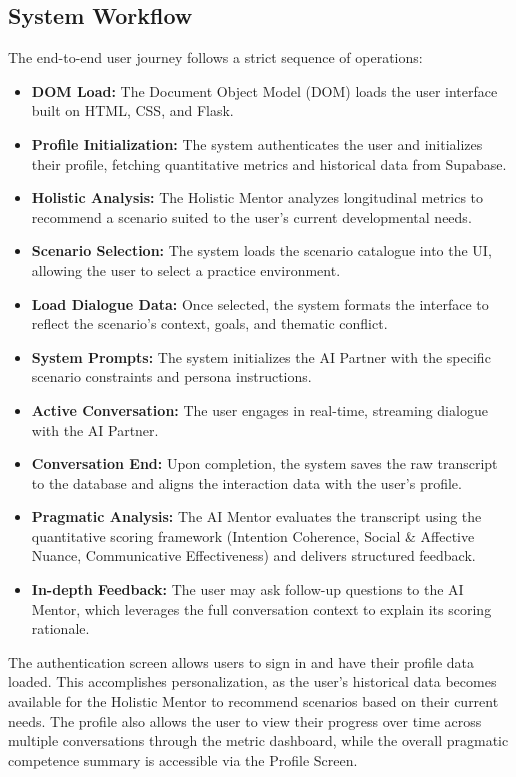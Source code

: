 \subsection{System Workflow}
The end-to-end user journey follows a strict sequence of operations:
\begin{itemize}
    \item \textbf{DOM Load:} The Document Object Model (DOM) loads the user interface built on HTML, CSS, and Flask.
    \item \textbf{Profile Initialization:} The system authenticates the user and initializes their profile, fetching quantitative metrics and historical data from Supabase.
    \item \textbf{Holistic Analysis:} The Holistic Mentor analyzes longitudinal metrics to recommend a scenario suited to the user's current developmental needs.
    \item \textbf{Scenario Selection:} The system loads the scenario catalogue into the UI, allowing the user to select a practice environment.
    \item \textbf{Load Dialogue Data:} Once selected, the system formats the interface to reflect the scenario's context, goals, and thematic conflict.
    \item \textbf{System Prompts:} The system initializes the AI Partner with the specific scenario constraints and persona instructions.
    \item \textbf{Active Conversation:} The user engages in real-time, streaming dialogue with the AI Partner.
    \item \textbf{Conversation End:} Upon completion, the system saves the raw transcript to the database and aligns the interaction data with the user's profile.
    \item \textbf{Pragmatic Analysis:} The AI Mentor evaluates the transcript using the quantitative scoring framework (Intention Coherence, Social \& Affective Nuance, Communicative Effectiveness) and delivers structured feedback.
    \item \textbf{In-depth Feedback:} The user may ask follow-up questions to the AI Mentor, which leverages the full conversation context to explain its scoring rationale.
\end{itemize}

The authentication screen allows users to sign in and have their profile data loaded. This accomplishes personalization, as the user's historical data becomes available for the Holistic Mentor to recommend scenarios based on their current needs. The profile also allows the user to view their progress over time across multiple conversations through the metric dashboard, while the overall pragmatic competence summary is accessible via the Profile Screen.

